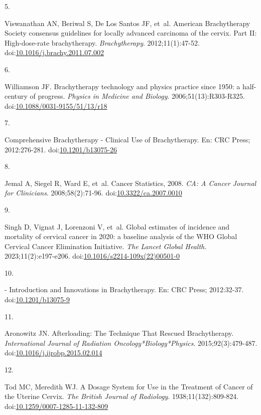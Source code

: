 \documentclass[
  a4paper,
]{scrreprt}
\newlength{\cslhangindent}
\newlength{\csllabelwidth}
\newlength{\cslentryspacingunit} %
\newenvironment{CSLReferences}[2] %
 {%
  \setlength{\parindent}{0pt}
  \ifodd #1
  \let\oldpar\par
  \def\par{\hangindent=\cslhangindent\oldpar}
  \fi
  \setlength{\parskip}{#2\cslentryspacingunit}
 }%
 {}
\newcommand{\CSLLeftMargin}[1]{\parbox[t]{\csllabelwidth}{#1}}
\newcommand{\CSLRightInline}[1]{\parbox[t]{\linewidth - \csllabelwidth}{#1}\break}
\begin{document}
\begin{CSLReferences}{0}{0}
\leavevmode{}%
\CSLLeftMargin{5. }%
\CSLRightInline{Viswanathan AN, Beriwal S, De Los Santos JF, et~al.
American Brachytherapy Society consensus guidelines for locally advanced
carcinoma of the cervix. Part II: High-dose-rate brachytherapy.
\emph{Brachytherapy}. 2012;11(1):47-52.
doi:\href{https://doi.org/10.1016/j.brachy.2011.07.002}{10.1016/j.brachy.2011.07.002}}

\leavevmode{}%
\CSLLeftMargin{6. }%
\CSLRightInline{Williamson JF. Brachytherapy technology and physics
practice since 1950: a half-century of progress. \emph{Physics in
Medicine and Biology}. 2006;51(13):R303-R325.
doi:\href{https://doi.org/10.1088/0031-9155/51/13/r18}{10.1088/0031-9155/51/13/r18}}

\leavevmode{}%
\CSLLeftMargin{7. }%
\CSLRightInline{Comprehensive Brachytherapy - Clinical Use of
Brachytherapy. En: CRC Press; 2012:276-281.
doi:\href{https://doi.org/10.1201/b13075-26}{10.1201/b13075-26}}

\leavevmode{}%
\CSLLeftMargin{8. }%
\CSLRightInline{Jemal A, Siegel R, Ward E, et~al. Cancer Statistics,
2008. \emph{CA: A Cancer Journal for Clinicians}. 2008;58(2):71-96.
doi:\href{https://doi.org/10.3322/ca.2007.0010}{10.3322/ca.2007.0010}}

\leavevmode{}%
\CSLLeftMargin{9. }%
\CSLRightInline{Singh D, Vignat J, Lorenzoni V, et~al. Global estimates
of incidence and mortality of cervical cancer in 2020: a baseline
analysis of the WHO Global Cervical Cancer Elimination Initiative.
\emph{The Lancet Global Health}. 2023;11(2):e197-e206.
doi:\href{https://doi.org/10.1016/s2214-109x(22)00501-0}{10.1016/s2214-109x(22)00501-0}}

\leavevmode{}%
\CSLLeftMargin{10. }%
\CSLRightInline{- Introduction and Innovations in Brachytherapy. En: CRC
Press; 2012:32-37.
doi:\href{https://doi.org/10.1201/b13075-9}{10.1201/b13075-9}}

\leavevmode{}%
\CSLLeftMargin{11. }%
\CSLRightInline{Aronowitz JN. Afterloading: The Technique That Rescued
Brachytherapy. \emph{International Journal of Radiation
Oncology*Biology*Physics}. 2015;92(3):479-487.
doi:\href{https://doi.org/10.1016/j.ijrobp.2015.02.014}{10.1016/j.ijrobp.2015.02.014}}

\leavevmode{}%
\CSLLeftMargin{12. }%
\CSLRightInline{Tod MC, Meredith WJ. A Dosage System for Use in the
Treatment of Cancer of the Uterine Cervix. \emph{The British Journal of
Radiology}. 1938;11(132):809-824.
doi:\href{https://doi.org/10.1259/0007-1285-11-132-809}{10.1259/0007-1285-11-132-809}}


\end{CSLReferences}
\end{document}
